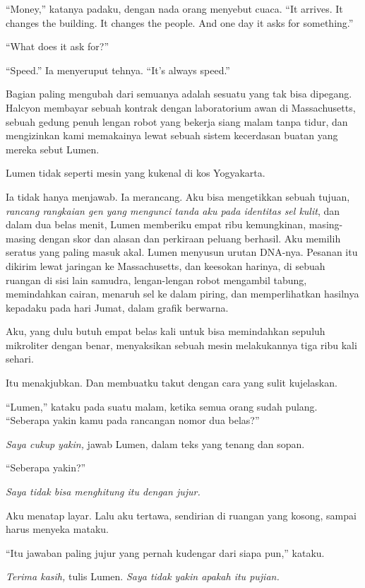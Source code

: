 \documentclass[11pt,twoside,openany]{book}
\makeatletter
\newcommand{\scenebreak}{\par\vspace{0.9em}{\centering\textsc{*\hspace{0.7em}*\hspace{0.7em}*}\par}\vspace{0.9em}\@afterindentfalse\@afterheading}
\makeatother
\begin{document}
``Money,'' katanya padaku, dengan nada orang menyebut cuaca. ``It arrives. It changes the building. It changes the people. And one day it asks for something.''

``What does it ask for?''

``Speed.'' Ia menyeruput tehnya. ``It's always speed.''

Bagian paling mengubah dari semuanya adalah sesuatu yang tak bisa dipegang. Halcyon membayar sebuah kontrak dengan laboratorium awan di Massachusetts, sebuah gedung penuh lengan robot yang bekerja siang malam tanpa tidur, dan mengizinkan kami memakainya lewat sebuah sistem kecerdasan buatan yang mereka sebut Lumen.

\scenebreak
Lumen tidak seperti mesin yang kukenal di kos Yogyakarta.

Ia tidak hanya menjawab. Ia merancang. Aku bisa mengetikkan sebuah tujuan, \emph{rancang rangkaian gen yang mengunci tanda aku pada identitas sel kulit}, dan dalam dua belas menit, Lumen memberiku empat ribu kemungkinan, masing-masing dengan skor dan alasan dan perkiraan peluang berhasil. Aku memilih seratus yang paling masuk akal. Lumen menyusun urutan DNA-nya. Pesanan itu dikirim lewat jaringan ke Massachusetts, dan keesokan harinya, di sebuah ruangan di sisi lain samudra, lengan-lengan robot mengambil tabung, memindahkan cairan, menaruh sel ke dalam piring, dan memperlihatkan hasilnya kepadaku pada hari Jumat, dalam grafik berwarna.

Aku, yang dulu butuh empat belas kali untuk bisa memindahkan sepuluh mikroliter dengan benar, menyaksikan sebuah mesin melakukannya tiga ribu kali sehari.

Itu menakjubkan. Dan membuatku takut dengan cara yang sulit kujelaskan.

``Lumen,'' kataku pada suatu malam, ketika semua orang sudah pulang. ``Seberapa yakin kamu pada rancangan nomor dua belas?''

\emph{Saya cukup yakin,} jawab Lumen, dalam teks yang tenang dan sopan.

``Seberapa yakin?''

\emph{Saya tidak bisa menghitung itu dengan jujur.}

Aku menatap layar. Lalu aku tertawa, sendirian di ruangan yang kosong, sampai harus menyeka mataku.

``Itu jawaban paling jujur yang pernah kudengar dari siapa pun,'' kataku.

\emph{Terima kasih,} tulis Lumen. \emph{Saya tidak yakin apakah itu pujian.}
\end{document}
